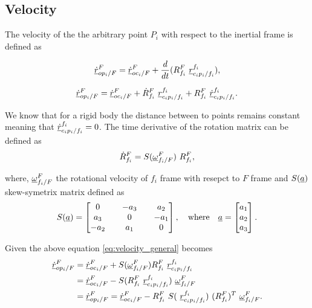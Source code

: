 \subsection{Velocity}
The velocity of the the arbitrary point $P_{i}$ with respect to the inertial frame 
is defined as

\[
    \pvec{\dot{r}}{op_{i}}{F}{F} = \pvec{\dot{r}}{oc_{i}}{F}{F} + 
    \frac{d}{dt}(\rot{R}{f_{i}}{F} \  \pvec{r}{c_{i}p_{i}}{f_i}{f_i}),
\]

\begin{equation}
    \pvec{\dot{r}}{op_{i}}{F}{F} = \pvec{\dot{r}}{oc_{i}}{F}{F} + 
    \rot{\dot{R}}{f_{i}}{F} \  \pvec{r}{c_{i}p_{i}}{f_i}{f_i} + 
    \rot{R}{f_{i}}{F} \  \pvec{\dot{r}}{c_{i}p_{i}}{f_i}{f_i}.
    \label{eq:velocity_general}
\end{equation}

We know that for a rigid body the distance between to points remains constant 
meaning that $\pvec{\dot{r}}{c_{i}p_{i}}{f_i}{f_i} = 0$. The time derivative of 
the rotation matrix can be defined as 
\begin{equation}
    \rot{\dot{R}}{f_{i}}{F} = S(\pvec{\omega}{f_{i}}{F}{F}) \ \rot{R}{f_{i}}{F},
    \label{eq:rot_mat_derivative}
\end{equation}

where, $\pvec{\omega}{f_{i}}{F}{F}$ the rotational velocity of $f_{i}$ frame 
with resepct to $F$ frame and $S(\vecd{a})$ skew-symetrix matrix defined as 
\[
    S(\vecd{a}) = \begin{bmatrix}
        0 && -a_{3} && a_{2} \\
        a_{3} && 0 && -a_{1} \\ 
        -a_{2} && a_{1} && 0 \\ 
    \end{bmatrix}, \quad \text{where} \quad \vecd{a} = \begin{bmatrix}
        a_{1} \\ a_{2} \\ a_{3}
    \end{bmatrix}.
\]

Given the above equation \eqref{eq:velocity_general} becomes
\begin{align*}
    \pvec{\dot{r}}{op_{i}}{F}{F} 
    & = \pvec{\dot{r}}{oc_{i}}{F}{F} + 
    S(\pvec{\omega}{f_{i}}{F}{F}) \rot{R}{f_{i}}{F} \ \pvec{r}{c_{i}p_{i}}{f_i}{f_i} \\
    & = \pvec{\dot{r}}{oc_{i}}{F}{F} - S(\rot{R}{f_{i}}{F} \ \pvec{r}{c_{i}p_{i}}{f_i}{f_i}) \ \pvec{\omega}{f_{i}}{F}{F} \\ 
    & = \pvec{\dot{r}}{op_{i}}{F}{F} = \pvec{\dot{r}}{oc_{i}}{F}{F} -
    \rot{R}{f_{i}}{F} \ S( \ \pvec{r}{c_{i}p_{i}}{f_i}{f_i}) \ (\rot{R}{f_{i}}{F})^{T} \ \pvec{\omega}{f_{i}}{F}{F}.  
\end{align*}

